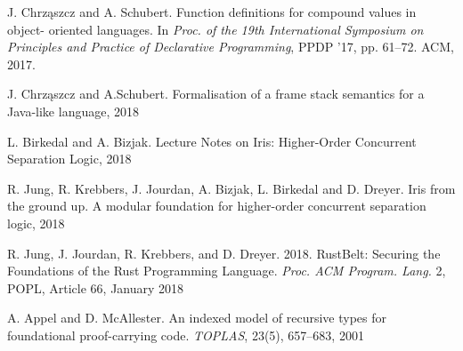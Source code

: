 \documentclass[]{pracamgr}
\renewcommand \| {\hspace{0.75em} | \hspace{0.75em} }
\renewcommand \[ {[\![}
\renewcommand \] {]\!]}
\theoremstyle{definition}
\begin{document}
\appendix
\begin{thebibliography}{99}

 J. Chrząszcz and A. Schubert. Function definitions for compound values in object-
oriented languages. In \textit{Proc. of the 19th International Symposium on Principles
and Practice of Declarative Programming}, PPDP ’17, pp. 61–72. ACM, 2017.

 J. Chrząszcz and A.Schubert. Formalisation of a frame stack semantics for a Java-like language, 2018

 L. Birkedal and A. Bizjak. Lecture Notes on Iris: Higher-Order
Concurrent Separation Logic, 2018

 R. Jung, R. Krebbers, J. Jourdan, A. Bizjak, L. Birkedal and D. Dreyer.
Iris from the ground up. A modular foundation for higher-order concurrent separation logic, 2018

 R. Jung, J. Jourdan, R. Krebbers, and D. Dreyer. 2018. RustBelt: Securing the
Foundations of the Rust Programming Language. \textit{Proc. ACM Program. Lang.} 2, POPL,
Article 66, January 2018

 A. Appel and D. McAllester. An indexed model of recursive types for
foundational proof-carrying code. \textit{TOPLAS}, 23(5), 657–683, 2001




\end{thebibliography}
\end{document}
